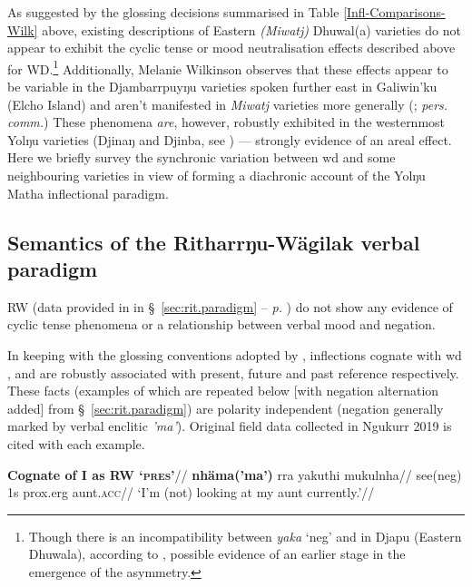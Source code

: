 As suggested by the glossing decisions summarised in Table \ref{Infl-Comparisons-Wilk} above, existing descriptions of Eastern \textit{(Miwatj)} Dhuwal(a) varieties \citep{Morphy1983,Heath1980} do not appear to exhibit the cyclic tense or mood neutralisation effects described above for WD.\footnote{Though there is an incompatibility between \textit{yaka} `\gls{neg}' and \III{} in Djapu (Eastern Dhuwala), according to \citet[72]{Morphy1983}, possible evidence of an earlier stage in the emergence of the asymmetry.} Additionally, Melanie Wilkinson observes that these effects appear to be variable in the Djambarrpuyŋu varieties spoken further east in Galiwin'ku (Elcho Island) and aren't manifested in \textit{Miwatj} varieties more generally (\citeyear[359\textit{ff}, 431]{Wilkinson1991}; \textit{pers. comm.}) These phenomena \textit{are}, however, robustly exhibited in the westernmost Yolŋu varieties (Djinaŋ and Djinba, see \citealp[192]{Waters1989}) --- strongly evidence of an areal effect. Here we briefly survey the synchronic variation between \gls{wd} and some neighbouring varieties in view of forming a diachronic account of the Yolŋu Matha inflectional paradigm.

 
\subsection{Semantics of the Ritharrŋu-Wägilak verbal paradigm}

\acrlong{RW} (data provided in in \S~{\ref{sec:rit.paradigm}} -- \textit{p.} \pageref{sec:rit.paradigm}) do not show any evidence of cyclic tense phenomena or a relationship between verbal mood and negation.

In keeping with the glossing conventions adopted by \citet{Heath1980r}, inflections cognate with \gls{wd} \I, \II{} and \III{} are robustly associated with present, future and past reference respectively. These facts (examples of which are repeated below [with negation alternation added] from \S~\ref{sec:rit.paradigm}) are polarity independent (negation generally marked by verbal enclitic \textit{\textdblhyphen'ma'}). Original field data collected in Ngukurr 2019 is cited with each example.



\ex\begingl\glpreamble \textbf{Cognate of \gls{I} as \acrshort{RW} `\textsc{pres}'}// \gla\textbf{nhäma(\textdblhyphen'ma')} rra yakuthi mukulnha//
\glb see(\textdblhyphen\gls{neg}) 1s \gls{prox}.\gls{erg} aunt.\textsc{acc}//
\glft`I'm (not) looking at my aunt currently.'\trailingcitation{[RN~20190520]}//\endgl\xe

